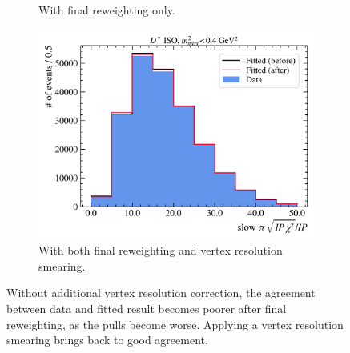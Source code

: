 \begin{figure}[htb]
\begin{subfigure}[t]{0.32\textwidth}
        \caption{With final reweighting only.}
        \label{fig:worse-pulls-after-final-rwt:final-rwt-only}
    \end{subfigure}
    \begin{subfigure}[t]{0.32\textwidth}
        \centering
        \includegraphics[width=\textwidth]{./figs-mc-correction/reweighting-final/plot_step12-Dst_iso-spi_comp.pdf}
        \caption{With both final reweighting and vertex resolution smearing.}
        \label{fig:worse-pulls-after-final-rwt:both}
    \end{subfigure}

    \caption{
        Without additional vertex resolution correction,
        the agreement between data and fitted result becomes poorer
        after final reweighting,
        as the pulls become worse.
        Applying a vertex resolution smearing brings \mmSq back to good
        agreement.
    }
    \label{fig:worse-pulls-after-final-rwt}
\end{figure}


